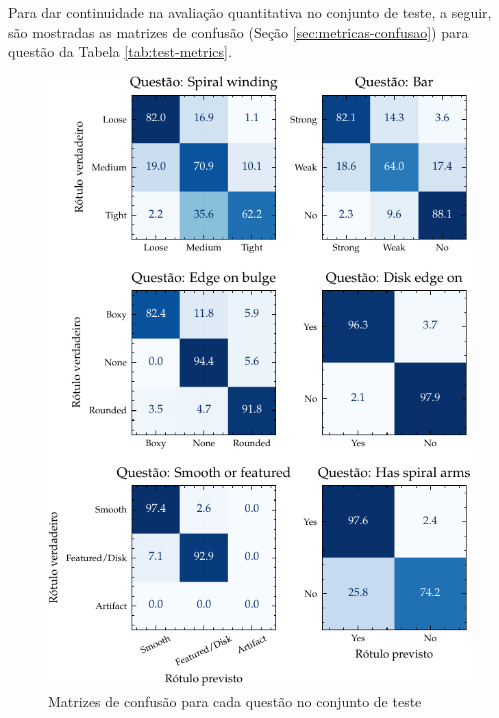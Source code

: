 Para dar continuidade na avaliação quantitativa no conjunto de teste, a seguir, são mostradas as matrizes de confusão (Seção \ref{sec:metricas-confusao}) para questão da Tabela \ref{tab:test-metrics}.


\begin{figure}[!ht]
  \centering
  \caption{Matrizes de confusão para cada questão no conjunto de teste}
  \label{fig:cm_1}
  \includegraphics[width=\linewidth]{notebooks/plots/cm_1.pdf}
\end{figure}

